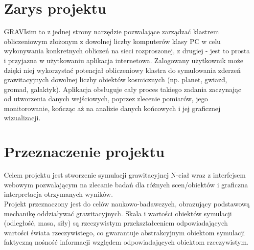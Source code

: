 \documentclass[a4paper,onecolumn,oneside,12pt]{memoir}
\begin{document}
\section{Zarys projektu}
\quad \quad GRAVIsim to z jednej strony narzędzie pozwalające zarządzać klastrem obliczeniowym złożonym z dowolnej liczby komputerów klasy PC w celu wykonywania konkretnych obliczeń na sieci rozproszonej, z drugiej - jest to prosta i przyjazna w użytkowaniu aplikacja internetowa. Zalogowany użytkownik może dzięki niej wykorzystać potencjał obliczeniowy klastra do symulowania zderzeń grawitacyjnych dowolnej liczby obiektów kosmicznych (np. planet, gwiazd, gromad, galaktyk). Aplikacja obsługuje cały proces takiego zadania zaczynając od utworzenia danych wejściowych, poprzez zlecenie pomiarów, jego monitorowanie, kończąc aż na analizie danych końcowych i jej graficznej wizualizacji.



\section{Przeznaczenie projektu}
\quad \quad Celem projektu jest stworzenie symulacji grawitacyjnej N-ciał wraz z interfejsem webowym pozwalającym na zlecanie badań dla różnych scen/obiektów i graficzna interpretacja otrzymanych wyników.\\
Projekt przeznaczony jest do celów naukowo-badawczych, obrazujący podstawową mechanikę oddziaływać grawitacyjnych. Skala i wartości obiektów symulacji (odległość, masa, siły) są rzeczywistym przekształceniem odpowiadających wartości świata rzeczywistego, co gwarantuje abstrakcyjnym obiektom symulacji faktyczną nośność informacji względem odpowiadających obiektom rzeczywistym.
\end{document}
